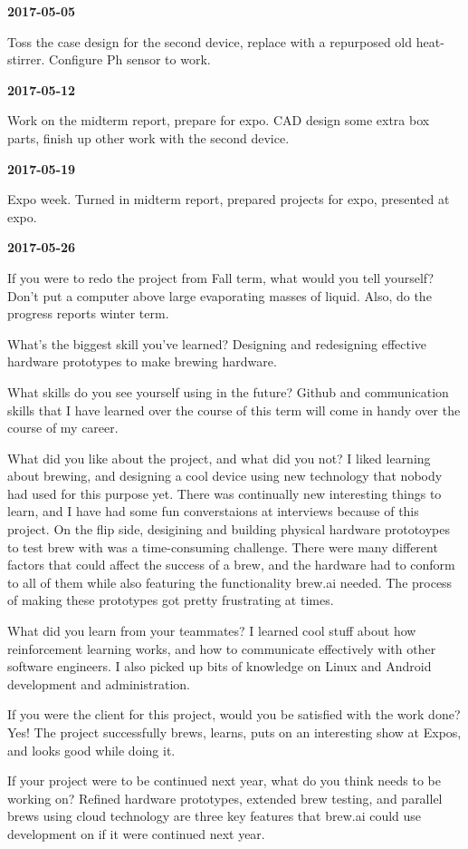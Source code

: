 \textbf{2017-05-05}

Toss the case design for the second device, replace with a repurposed old heat-stirrer. Configure Ph sensor to work.

\textbf{2017-05-12}

Work on the midterm report, prepare for expo. CAD design some extra box parts, finish up other work with the second device.

\textbf{2017-05-19}

Expo week. Turned in midterm report, prepared projects for expo, presented at expo.

\textbf{2017-05-26}

 If you were to redo the project from Fall term, what would you tell yourself?
Don't put a computer above large evaporating masses of liquid. Also, do the progress reports winter term.

 What's the biggest skill you've learned?
Designing and redesigning effective hardware prototypes to make brewing hardware.

 What skills do you see yourself using in the future?
Github and communication skills that I have learned over the course of this term will come in handy over the course of my career.

 What did you like about the project, and what did you not?
I liked learning about brewing, and designing a cool device using new technology that nobody had used for this purpose yet. There was continually new interesting things to learn, and I have had some fun converstaions at interviews because of this project. On the flip side, desigining and building physical hardware prototoypes to test brew with was a time-consuming challenge. There were many different factors that could affect the success of a brew, and the hardware had to conform to all of them while also featuring the functionality brew.ai needed. The process of making these prototypes got pretty frustrating at times.

 What did you learn from your teammates?
I learned cool stuff about how reinforcement learning works, and how to communicate effectively with other software engineers. I also picked up bits of knowledge on Linux and Android development and administration.

 If you were the client for this project, would you be satisfied with the work done?
Yes! The project successfully brews, learns, puts on an interesting show at Expos, and looks good while doing it.

 If your project were to be continued next year, what do you think needs to be working on?
Refined hardware prototypes, extended brew testing, and parallel brews using cloud technology are three key features that brew.ai could use development on if it were continued next year.

